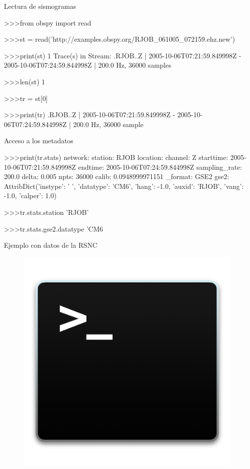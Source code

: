 \documentclass[11pt]{beamer}
\begin{document}
\begin{frame}[fragile]{Lectura de sismogramas}
\begin{pythoncode}
>>>from obspy import read

>>>st = read('http://examples.obspy.org/RJOB_061005_072159.ehz.new')

>>>print(st)
1 Trace(s) in Stream:
.RJOB..Z | 2005-10-06T07:21:59.849998Z - 2005-10-06T07:24:59.844998Z | 200.0 Hz, 36000 samples

>>>len(st)
1

>>>tr = st[0]  

>>>print(tr)
.RJOB..Z | 2005-10-06T07:21:59.849998Z - 2005-10-06T07:24:59.844998Z | 200.0 Hz, 36000 sample
\end{pythoncode}
\end{frame}



\begin{frame}[fragile]{Acceso a los metadatos}
\begin{pythoncode}
>>>print(tr.stats)  
         network:
         station: RJOB
        location:
         channel: Z
       starttime: 2005-10-06T07:21:59.849998Z
         endtime: 2005-10-06T07:24:59.844998Z
   sampling_rate: 200.0
           delta: 0.005
            npts: 36000
           calib: 0.0948999971151
         _format: GSE2
            gse2: AttribDict({'instype': '      ', 'datatype': 'CM6', 
            'hang': -1.0, 'auxid': 'RJOB', 'vang': -1.0, 'calper': 1.0})

>>>tr.stats.station
'RJOB'

>>>tr.stats.gse2.datatype
'CM6
\end{pythoncode}
\end{frame}

\begin{frame}
Ejemplo con datos de la RSNC
\begin{figure}
\includegraphics[scale=0.5]{terminal.png}
\end{figure}
\end{frame}
\end{document}

